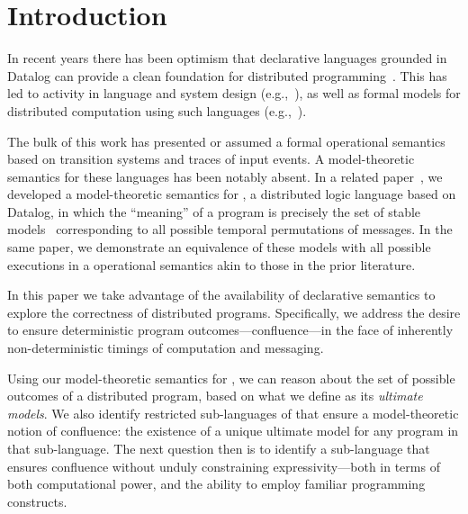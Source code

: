 \section{Introduction}

In recent years there has been optimism that declarative languages grounded in
Datalog can provide a clean foundation for distributed
programming~\cite{declarative-imperative}.  This has led to activity in language
and system design (e.g.,~\cite{boom,Belaramani:2009,Chu:2007,Loo2009-CACM}), 
as well as formal
models for distributed computation using such
languages (e.g.,~\cite{relational-transducers,navarro-oper-sem,card-abstraction}).

The bulk of this work has presented or assumed a formal operational semantics based on transition systems
and traces of input events.  A model-theoretic semantics for these languages has been notably absent.
In a related paper~\cite{ameloot-operational}, we developed a model-theoretic
semantics for \lang, a distributed logic language based on Datalog, in which the ``meaning''
of a program is precisely the set of stable models~\cite{sacca-zaniolo} corresponding to all possible temporal permutations of messages. %
In the same paper, we demonstrate an equivalence of these models with all possible executions in a operational semantics akin to those in the prior literature.

In this paper we take advantage of the availability of declarative semantics to explore the correctness of distributed programs.  Specifically, we address the desire to ensure deterministic program outcomes---confluence---in the face of inherently non-deterministic timings of computation and messaging.  %

Using our model-theoretic semantics for
\lang, we can reason about the set of possible outcomes of a distributed program, based on what we define as its \emph{ultimate models}.  
We also identify restricted sub-languages of \lang that ensure a model-theoretic notion of confluence: the existence of a unique ultimate model for any program in that sub-language. The next question then is to identify a sub-language that ensures confluence without unduly constraining expressivity---both in terms of both computational power, and the ability to employ familiar programming constructs.

